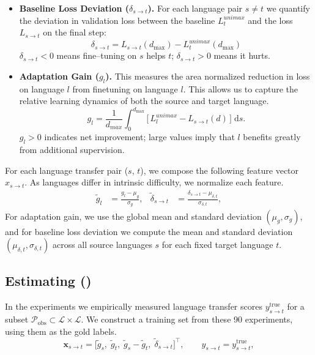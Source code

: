 \begin{itemize}%

    \item \textbf{Baseline Loss Deviation ($\delta_{s\rightarrow t}$).} 
    For each language pair $s\neq t$ we quantify the deviation in validation loss between the baseline $L^{unimax}_t$ and the loss $L_{s \rightarrow t}$ on the final step: $$\delta_{s\rightarrow t} = L_{s \rightarrow t}(d_\text{max}) - L^{unimax}_t(d_\text{max})$$
    $\delta_{s\rightarrow t}<0$ means fine–tuning on $s$ helps\/ $t$;
    $\delta_{s\rightarrow t}>0$ means it hurts.
    
    \item \textbf{Adaptation Gain ($g_{l}$).} This measures the area normalized reduction in loss on language $l$ from finetuning on language $l$. This allows us to capture the relative learning dynamics of both the source and target language.
    $$g_{l} = \frac{1}{d_{max}} \int_{0}^{d_{\text{max}}} \bigl[\,L^{unimax}_l - L_{s \rightarrow t}(d)\,\bigr]\; \mathrm{d}s.$$
    $g_l>0$ indicates net improvement; large values imply that $l$
    benefits greatly from additional supervision.

\end{itemize}

For each language transfer pair ($s$, $t$), we compose the following feature vector $x_{s \rightarrow t}$. 
As languages differ in intrinsic difficulty, we normalize each feature. 
%
\begin{align}
\tilde{g}_l &=
\frac{g_l - \mu_g}{\sigma_g},
&
\tilde{\delta}_{s\rightarrow t} &=
\frac{\delta_{s\rightarrow t}-\mu_{\delta,t}}{\sigma_{\delta,t}},
\label{eq:zscore}
\end{align}
%
For adaptation gain, we use the global mean and standard deviation $(\mu_g,\sigma_g)$, and for baseline loss deviation we compute the mean and standard deviation $(\mu_{\delta,t},\sigma_{\delta,t})$ across all source languages $s$ for each fixed target language $t$.

\subsection{Estimating \bts{} (\btsabb)}
\label{app:lang-transfer-bts-estimation}


In the \bts{} experiments we empirically measured language transfer scores
${y}_{s\rightarrow t}^{\text{true}}$ for a subset
$\mathcal{P}_{\text{obs}}\subset\mathcal{L}\!\times\!\mathcal{L}$. 
We construct a training set from these 90 experiments, using them as the gold labels.
%
\begin{equation}
\mathbf{x}_{s\rightarrow t}
=
\bigl[
\tilde{g}_s,\;
\tilde{g}_t,\;
\tilde{g}_s-\tilde{g}_t,\;
\tilde{\delta}_{s\rightarrow t}
\bigr]^{\!\top},
\qquad
y_{s\rightarrow t}=y^{\text{true}}_{s\rightarrow t},
\label{eq:features}
\end{equation}
%

